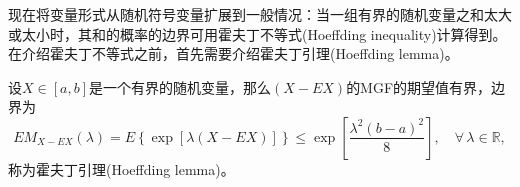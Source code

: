 现在将变量形式从随机符号变量扩展到一般情况：当一组有界的随机变量之和太大或太小时，其和的概率的边界可用霍夫丁不等式(Hoeffding inequality)计算得到。在介绍霍夫丁不等式之前，首先需要介绍霍夫丁引理(Hoeffding lemma)。
\begin{lemma}[霍夫丁引理]
  \label{lemma:hoeffding-lemma}
  设$X \in [a,b]$是一个有界的随机变量，那么$ \left( X - E X \right)$的MGF的期望值有界，边界为
  \begin{equation}
    \label{eq:hoeffding-lemma}
    E M_{X - E X} \left( \lambda \right)
    = E \left\{
    \exp \left[ \lambda \left( X - E X \right) \right]
    \right\}
    \le \exp
    \left[
    \frac{\lambda^{2} \left( b - a \right)^{2}}{8}
    \right], \quad \forall \, \lambda \in \mathbb{R},
  \end{equation}
  称为霍夫丁引理(Hoeffding lemma)。
\end{lemma}
